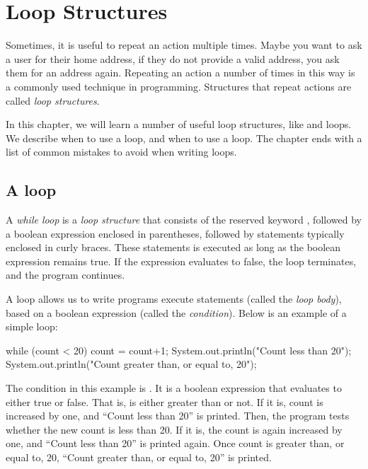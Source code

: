 \chapter{Loop Structures}

Sometimes, it is useful to repeat an action multiple times. Maybe you want to
ask a user for their home address, if they do not provide a valid address, you
ask them for an address again. Repeating an action a number of times in this way
is a commonly used technique in programming. Structures that repeat actions are
called \emph{loop structures}.

In this chapter, we will learn a number of useful loop structures, like
 and  loops. We describe when to use a  loop, and
when to use a  loop. The chapter ends with a list of common mistakes to
avoid when writing loops.

\section{A  loop}

\begin{definition}
A \emph{while loop} is a \emph{loop structure} that consists of the reserved
keyword , followed by a boolean expression enclosed in parentheses,
followed by statements typically enclosed in curly braces. These statements is
executed as long as the boolean expression remains true. If the expression
evaluates to false, the loop terminates, and the program continues.
\end{definition}

A  loop allows us to write programs execute statements
(called the \emph{loop body}), based on a boolean expression (called the \emph{condition}). Below is an example of a simple  loop:

\begin{code}
while (count < 20) {
  count = count+1;
  System.out.println("Count less than 20");
}
System.out.println("Count greater than, or equal to, 20");
\end{code}

\noindent The condition in this example is . It is a boolean
expression that evaluates to either true or false. That is,  is either
greater than  or not. If it is, count is increased by one, and ``Count
less than 20'' is printed. Then, the program tests whether the new count is less
than 20. If it is, the count is again increased by one, and ``Count less than
20'' is printed again. Once count is greater than, or equal to, 20, ``Count
greater than, or equal to, 20'' is printed.

